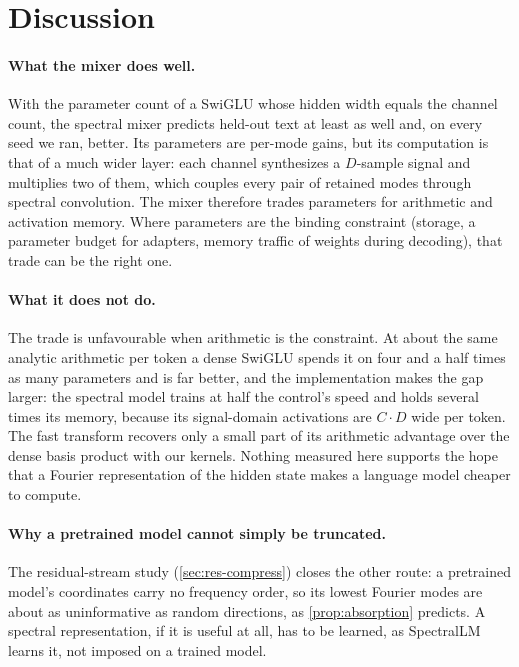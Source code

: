 
\section{Discussion}
\label{sec:discussion}

\paragraph{What the mixer does well.} With the parameter count of a SwiGLU
whose hidden width equals the channel count, the spectral mixer predicts
held-out text at least as well and, on every seed we ran, better. Its
parameters are per-mode gains, but its computation is that of a much wider
layer: each channel synthesizes a $D$-sample signal and multiplies two of them,
which couples every pair of retained modes through spectral convolution. The
mixer therefore trades parameters for arithmetic and activation memory. Where
parameters are the binding constraint (storage, a parameter budget for
adapters, memory traffic of weights during decoding), that trade can be the
right one.

\paragraph{What it does not do.} The trade is unfavourable when arithmetic is
the constraint. At about the same analytic arithmetic per token a dense
SwiGLU spends it on four and a half times as many parameters and is far
better, and the implementation makes the gap larger: the spectral model trains
at half the control's speed and holds several times its memory, because its
signal-domain activations are $C\cdot D$ wide per token. The fast transform
recovers only a small part of its arithmetic advantage over the dense basis
product with our kernels. Nothing measured here supports the hope that a
Fourier representation of the hidden state makes a language model cheaper to
compute.

\paragraph{Why a pretrained model cannot simply be truncated.} The
residual-stream study (\cref{sec:res-compress}) closes the other route: a
pretrained model's coordinates carry no frequency order, so its lowest
Fourier modes are about as uninformative as random directions, as
\cref{prop:absorption} predicts. A spectral representation, if it is useful
at all, has to be learned, as SpectralLM learns it, not imposed on a trained
model.

